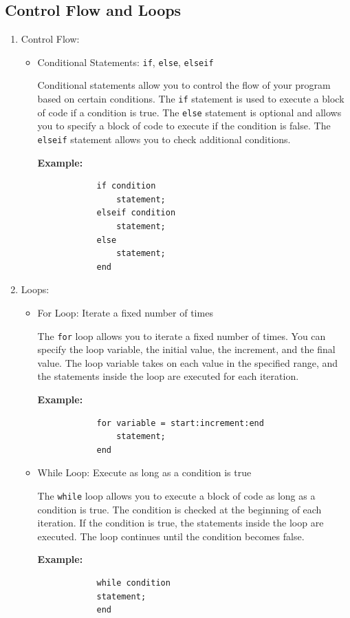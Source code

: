 \documentclass[
11pt, %
a4paper, %
oneside, %
headinclude,footinclude, %
BCOR5mm, %
]{scrartcl}
\begin{document}
\subsection{Control Flow and Loops}
    \begin{enumerate}
	\item Control Flow:
	\begin{itemize}
		\item Conditional Statements: \texttt{if}, \texttt{else}, \texttt{elseif}
		
		Conditional statements allow you to control the flow of your program based on certain conditions. The \texttt{if} statement is used to execute a block of code if a condition is true. The \texttt{else} statement is optional and allows you to specify a block of code to execute if the condition is false. The \texttt{elseif} statement allows you to check additional conditions.
		
		\textbf{Example:}
		\begin{verbatim}
			if condition
			    statement;
			elseif condition
			    statement;
			else
			    statement;
			end
		\end{verbatim}
	\end{itemize}
	
	\item Loops:
	\begin{itemize}
		\item For Loop: Iterate a fixed number of times
		
		The \texttt{for} loop allows you to iterate a fixed number of times. You can specify the loop variable, the initial value, the increment, and the final value. The loop variable takes on each value in the specified range, and the statements inside the loop are executed for each iteration.
		
		\textbf{Example:}
		\begin{verbatim}
			for variable = start:increment:end
			    statement;
			end
		\end{verbatim}
		
		\item While Loop: Execute as long as a condition is true
		
		The \texttt{while} loop allows you to execute a block of code as long as a condition is true. The condition is checked at the beginning of each iteration. If the condition is true, the statements inside the loop are executed. The loop continues until the condition becomes false.
		
		\textbf{Example:}
		\begin{verbatim}
			while condition
			statement;
			end
		\end{verbatim}
	\end{itemize}
\end{enumerate}
\end{document}
